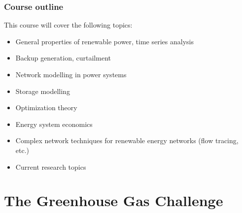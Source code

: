 \documentclass[10pt,aspectratio=169,dvipsnames]{beamer}
\let\olditem\item
\renewcommand{\item}{%
\olditem\vspace{5pt}}
\begin{document}
\begin{frame}
  \frametitle{Course outline}

  This course will cover the following topics:

  \begin{itemize}
  \item General properties of renewable power, time series analysis
    \item Backup generation, curtailment
  \item Network modelling in power systems
  \item Storage modelling
  \item Optimization theory
  \item Energy system economics
      \item Complex network techniques for renewable energy networks (flow tracing, etc.)
    \item Current research topics
  \end{itemize}


\end{frame}






\section{The Greenhouse Gas Challenge}
\end{document}
